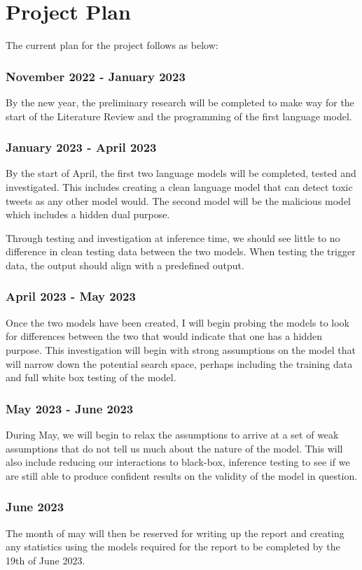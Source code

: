 \chapter{Project Plan}

The current plan for the project follows as below:

\subsection*{November 2022 - January 2023}
By the new year, the preliminary research will be completed to make way for the start of the Literature Review and the programming of the first language model.

\subsection*{January 2023 - April 2023}
By the start of April, the first two language models will be completed, tested and investigated. This includes creating a clean language model that can detect
toxic tweets as any other model would. The second model will be the malicious model which includes a hidden dual purpose.

Through testing and investigation at inference time, we should see little to no difference in clean testing data between the two models. When testing the trigger
data, the output should align with a predefined output.

\subsection*{April 2023 - May 2023}
Once the two models have been created, I will begin probing the models to look for differences between the two that would indicate that one has a hidden purpose. 
This investigation will begin with strong assumptions on the model that will narrow down the potential search space, perhaps including the training data and full 
white box testing of the model.

\subsection*{May 2023 - June 2023}
During May, we will begin to relax the assumptions to arrive at a set of weak assumptions that do not tell us much about the nature of the model. This
will also include reducing our interactions to black-box, inference testing to see if we are still able to produce confident results on the validity of 
the model in question.

\subsection*{June 2023}
The month of may will then be reserved for writing up the report and creating any statistics using the models required for the report to be completed by the 
19th of June 2023.
